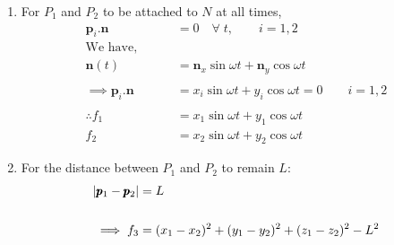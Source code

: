\begin{enumerate}
    \item For $P_1$ and $P_2$ to be attached to $N$ at all times,
    \begin{align*}
        \pmb p_i .  \pmb n &= 0 \quad \forall \; t, \qquad i = 1, 2\\
        \text{We have, } \qquad &\\
        \pmb n(t) &= \pmb n_x \sin \omega t + \pmb n_y \cos \omega t\\
        \\
        \implies \pmb p_i .  \pmb n &= x_i \sin \omega t + y_i \cos \omega t = 0 \qquad i=1, 2\\
        \\
        \therefore f_1 &= x_1 \sin \omega t + y_1 \cos \omega t\\
                   f_2 &= x_2 \sin \omega t + y_2 \cos \omega t
    \end{align*}

    \item For the distance between $P_1$ and $P_2$ to remain $L$:
    \begin{align*}
        \left\lvert \pmb p_1 - \pmb p_2 \right\rvert &= L\\
        \\
        \implies f_3 &= (x_1 - x_2)^2 + (y_1 - y_2)^2 + (z_1 - z_2)^2 - L^2
    \end{align*}
\end{enumerate}
